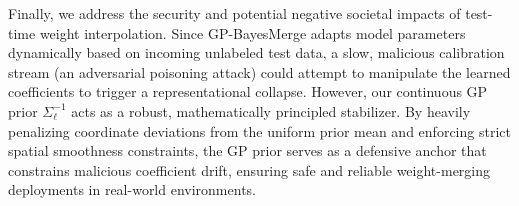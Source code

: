 Finally, we address the security and potential negative societal impacts of test-time weight interpolation. Since GP-BayesMerge adapts model parameters dynamically based on incoming unlabeled test data, a slow, malicious calibration stream (an adversarial poisoning attack) could attempt to manipulate the learned coefficients to trigger a representational collapse. However, our continuous GP prior $\Sigma_{\ell}^{-1}$ acts as a robust, mathematically principled stabilizer. By heavily penalizing coordinate deviations from the uniform prior mean and enforcing strict spatial smoothness constraints, the GP prior serves as a defensive anchor that constrains malicious coefficient drift, ensuring safe and reliable weight-merging deployments in real-world environments.
